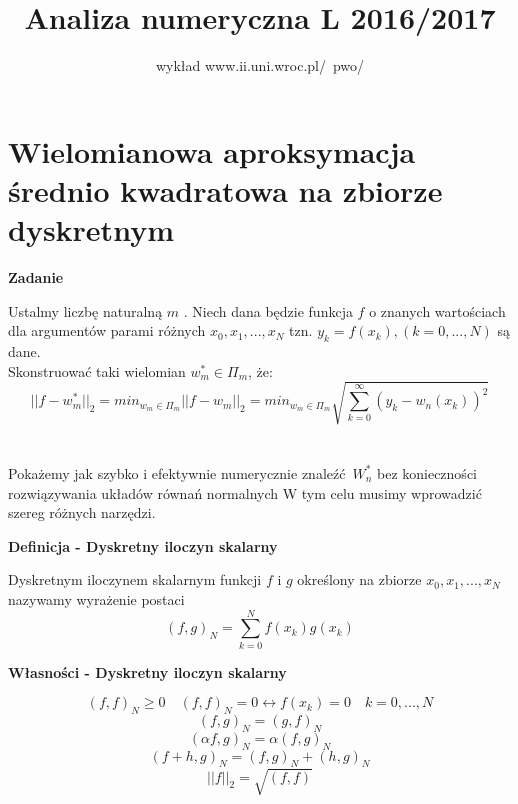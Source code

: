 \documentclass[polish]{kbk}
\begin{document}
\author{wykład www.ii.uni.wroc.pl/~pwo/}
\title{Analiza numeryczna L 2016/2017}



\maketitle

\section{Wielomianowa aproksymacja średnio kwadratowa na zbiorze dyskretnym}

\begin{center}
\textbf{Zadanie}
\end{center}
Ustalmy liczbę naturalną  \(m\) . Niech dana będzie funkcja \(f\) o znanych wartościach dla argumentów parami różnych \(x_0, x_1, ... , x_N\) tzn. 
 \(y_k = f(x_k), (k =0,...,N) \) są dane.\\
Skonstruować taki wielomian \(   w^{*}_m \in \Pi_{m}  \), że:
$$ || f -  w^{*}_m ||_2 = min_{ w_m \in \Pi_m } || f - w_m||_2 = min_{ w_m \in \Pi_m } \sqrt{  \sum_{k=0}^{\infty} (y_k - w_n (x_k))^2 }$$
\\
\\
Pokażemy jak szybko i efektywnie numerycznie znaleźć \(W^{*}_n \) bez konieczności rozwiązywania układów równań normalnych
W tym celu musimy wprowadzić szereg różnych narzędzi.
\\
\begin{center}
\textbf{Definicja - Dyskretny iloczyn skalarny}
\end{center}

Dyskretnym iloczynem skalarnym funkcji \(f\) i \(g\) określony na zbiorze  \(x_0, x_1, ... , x_N\) nazywamy wyrażenie postaci
$$ (f,g)_N =  \sum_{k=0}^{N} f(x_k)  g(x_k) $$


\begin{center}
\textbf{Własności - Dyskretny iloczyn skalarny}
\end{center}
$$ (f,f)_N \geq 0 \quad (f,f)_N = 0  \leftrightarrow  f(x_k) = 0  \quad k = 0,...,N$$
$$ (f,g)_N = (g,f)_N $$
$$ (\alpha f,g)_N = \alpha (f,g)_N $$
$$ (f+h, g)_N = (f,g)_N + (h,g)_N $$
$$ ||f||_2 = \sqrt { (f,f) } $$ 
\end{document}
